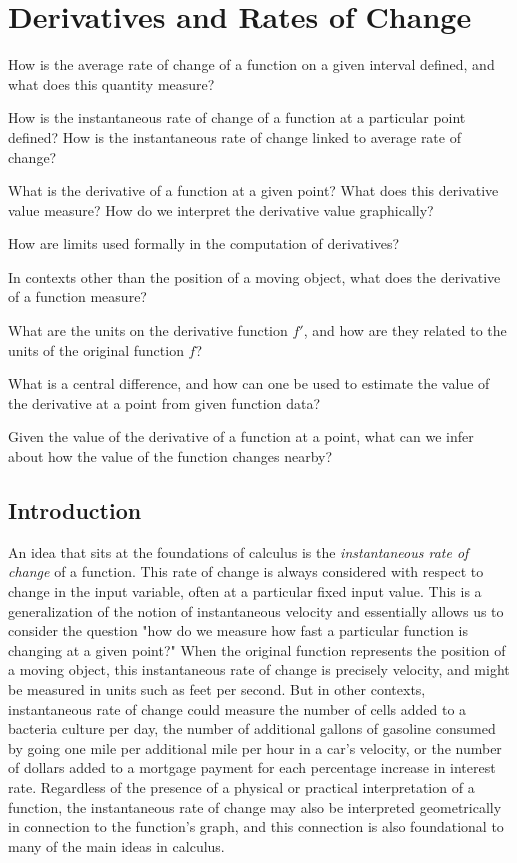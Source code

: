 \section{Derivatives and Rates of Change} \label{S:2.1.DerivativePt}

\begin{goals}
\item How is the average rate of change of a function on a given interval defined, and what does this quantity measure?
\item How is the instantaneous rate of change of a function at a particular point defined?  How is the instantaneous rate of change linked to average rate of change?
\item What is the derivative of a function at a given point?  What does this derivative value measure? How do we interpret the derivative value graphically?
\item How are limits used formally in the computation of derivatives? 
\item In contexts other than the position of a moving object, what does the derivative of a function measure?
\item What are the units on the derivative function $f'$, and how are they related to the units of the original function $f$?
\item What is a central difference, and how can one be used to estimate the value of the derivative at a point from given function data?
\item Given the value of the derivative of a function at a point, what can we infer about how the value of the function changes nearby?
\end{goals}

\subsection*{Introduction}

An idea that sits at the foundations of calculus is the \emph{instantaneous rate of change} of a function.  This rate of change is always considered with respect to change in the input variable, often at a particular fixed input value.  This is a generalization of the notion of instantaneous velocity and essentially allows us to consider the question "how do we measure how fast a particular function is changing at a given point?"  When the original function represents the position of a moving object, this instantaneous rate of change is precisely velocity, and might be measured in units such as feet per second.  But in other contexts, instantaneous rate of change could measure the number of cells added to a bacteria culture per day, the number of additional gallons of gasoline consumed by going one mile per additional mile per hour in a car's velocity, or the number of dollars added to a mortgage payment for each percentage increase in interest rate.  Regardless of the presence of a physical or practical interpretation of a function, the instantaneous rate of change may also be interpreted geometrically in connection to the function's graph, and this connection is also foundational to many of the main ideas in calculus.


